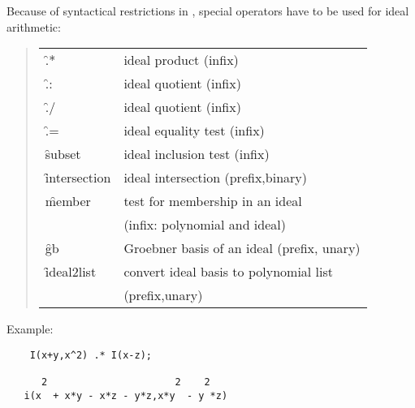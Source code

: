Because of syntactical restrictions in \REDUCE, special operators
have to be used for ideal arithmetic:
\hypertarget{operator:IDEALS_IDEALSUM}{}
\hypertarget{operator:IDEALPRODUCT}{}
\hypertarget{operator:IDEALS_IDEALQUOTIENT}{}
\hypertarget{operator:IDEALQUOTIENTALT}{}
\hypertarget{operator:IDEALEQUALITY}{}
\hypertarget{operator:IDEALSUBSET}{}
\hypertarget{operator:IDEALINTERSECTION}{}
\hypertarget{operator:IDEALMEMBER}{}
\hypertarget{operator:IDEALGB}{}
\begin{quote}
  \begin{tabular}{ll}
    \f{.*}           &  ideal product (infix) \\
    \f{.:}           &  ideal quotient (infix) \\
    \f{./}           &  ideal quotient (infix) \\
    \f{.=}           &  ideal equality test (infix) \\
    \f{subset}       &  ideal inclusion test (infix) \\
    \f{intersection} &  ideal intersection (prefix,binary) \\
    \f{member}       &  test for membership in an ideal \\
                     &    (infix: polynomial and ideal) \\
    \f{gb}           &  Groebner basis of an ideal (prefix, unary) \\
    \f{ideal2list}   &  convert ideal basis to polynomial list \\
                     &  (prefix,unary)
  \end{tabular}
\end{quote}

Example:

\begin{verbatim}
    I(x+y,x^2) .* I(x-z);

      2                      2    2
   i(x  + x*y - x*z - y*z,x*y  - y *z)
\end{verbatim}

